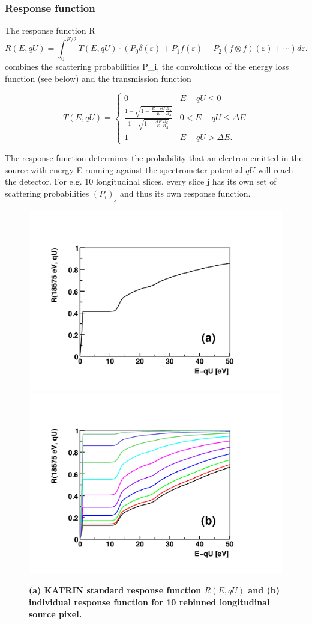 \subsubsection{Response function}\label{_s_s_cmain_response}
The response function R \[ R(E, qU) = \int_0^{E/2} T(E, qU) \cdot(P_0 \delta(\varepsilon) + P_1 f(\varepsilon)+P_2(f\otimes f)(\varepsilon)+ \cdots)d\varepsilon . \] combines the scattering probabilities P\_\-i, the convolutions of the energy loss function (see below) and the transmission function

\begin{equation}
	T(E, qU) = \begin{cases}
	0				& E-qU \leq 0 \\
	\frac{1-\sqrt{1-\frac{E-qU}{E}\frac{B_S}{B_A}}}{1-\sqrt{1-\frac{\Delta E}{E}\frac{B_S}{B_A}}} & 0<E-qU\leq\Delta E \\
	1					&	E-qU > \Delta E.
	\end{cases}
	\label{eq: Transmissionsfunktion}
\end{equation}

The response function determines the probability that an electron emitted in the source with energy E running against the spectrometer potential $qU$ will reach the detector. For e.g. 10 longitudinal slices, every slice j has its own set of scattering probabilities $(P_i)_j$ and thus its own response function.
\begin{figure}[ptb]%
  	\includegraphics[width=0.50\columnwidth, trim= 40 40 40 40, clip]{images/SSCPlots/responsefunction.pdf}%
	\includegraphics[width=0.50\columnwidth, trim= 40 40 40 40, clip]{images/SSCPlots/responseeverybin.pdf}%
	\caption{\textbf{(a) KATRIN standard response function $R(E,qU)$ and (b) individual response function for 10 rebinned longitudinal source pixel.}}%
	\label{fig:Response10bins}%
\end{figure}


